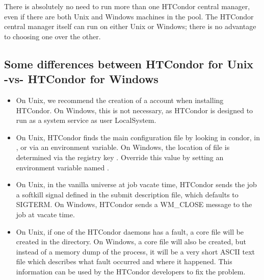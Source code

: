 There is absolutely no need to run more than one HTCondor central manager,
even if there are both Unix and Windows machines in the pool.
The HTCondor central manager
itself can run on either Unix or Windows; there is no advantage to choosing
one over the other.

\subsection{Some differences between HTCondor for Unix -vs- HTCondor for Windows}

\begin{itemize}

\item On Unix, we recommend the creation of a  account
when installing HTCondor.  On Windows, this is not necessary, as HTCondor is
designed to run as a system service as user LocalSystem.

\item On Unix, HTCondor finds the  main configuration
file by looking in \Tilde condor, in , 
or via an environment variable.
On Windows, the location of  file is determined
via the registry key .
Override this value by setting an environment variable named
.

\item On Unix, in the vanilla universe at job vacate time,
HTCondor sends the
job a softkill signal defined in the submit description file,
which defaults to SIGTERM.
On Windows, HTCondor sends a WM\_CLOSE message to the job at vacate
time.

\item On Unix, if one of the HTCondor daemons has a fault, a core file
will be created in the  directory.  
On Windows, a core file will also be created, 
but instead of a memory dump of the process,
it will be a very short ASCII text file which describes what
fault occurred and where it happened.  This information can be used by
the HTCondor developers to fix the problem.

\end{itemize}

